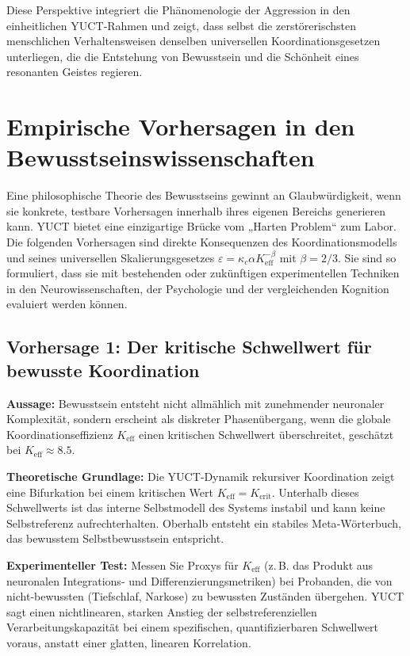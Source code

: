 \documentclass[12pt,a4paper]{article}
\begin{document}
	Diese Perspektive integriert die Phänomenologie der Aggression in den einheitlichen YUCT‑Rahmen und zeigt, dass selbst die zerstörerischsten menschlichen Verhaltensweisen denselben universellen Koordinationsgesetzen unterliegen, die die Entstehung von Bewusstsein und die Schönheit eines resonanten Geistes regieren.
	
	\section{Empirische Vorhersagen in den Bewusstseinswissenschaften}
	
	Eine philosophische Theorie des Bewusstseins gewinnt an Glaubwürdigkeit, wenn sie konkrete, testbare Vorhersagen innerhalb ihres eigenen Bereichs generieren kann. YUCT bietet eine einzigartige Brücke vom „Harten Problem“ zum Labor. Die folgenden Vorhersagen sind direkte Konsequenzen des Koordinationsmodells und seines universellen Skalierungsgesetzes \(\varepsilon = \kappa_c \alpha K_{\mathrm{eff}}^{-\beta}\) mit \(\beta = 2/3\). Sie sind so formuliert, dass sie mit bestehenden oder zukünftigen experimentellen Techniken in den Neurowissenschaften, der Psychologie und der vergleichenden Kognition evaluiert werden können.
	
	\subsection{Vorhersage 1: Der kritische Schwellwert für bewusste Koordination}
	
	\textbf{Aussage:} Bewusstsein entsteht nicht allmählich mit zunehmender neuronaler Komplexität, sondern erscheint als diskreter Phasenübergang, wenn die globale Koordinationseffizienz \(K_{\mathrm{eff}}\) einen kritischen Schwellwert überschreitet, geschätzt bei \(K_{\mathrm{eff}} \approx 8.5\).
	
	\textbf{Theoretische Grundlage:} Die YUCT‑Dynamik rekursiver Koordination zeigt eine Bifurkation bei einem kritischen Wert \(K_{\mathrm{eff}} = K_{\mathrm{crit}}\). Unterhalb dieses Schwellwerts ist das interne Selbstmodell des Systems instabil und kann keine Selbstreferenz aufrechterhalten. Oberhalb entsteht ein stabiles Meta‑Wörterbuch, das bewusstem Selbstbewusstsein entspricht.
	
	\textbf{Experimenteller Test:} Messen Sie Proxys für \(K_{\mathrm{eff}}\) (z. B. das Produkt aus neuronalen Integrations‑ und Differenzierungsmetriken) bei Probanden, die von nicht‑bewussten (Tiefschlaf, Narkose) zu bewussten Zuständen übergehen. YUCT sagt einen nichtlinearen, starken Anstieg der selbstreferenziellen Verarbeitungskapazität bei einem spezifischen, quantifizierbaren Schwellwert voraus, anstatt einer glatten, linearen Korrelation.
	
\end{document}
